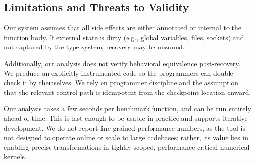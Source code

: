 \subsection{Limitations and Threats to Validity}
\label{sec:threats}

Our system assumes that all side effects are either annotated or internal to the function body. If external state is dirty (e.g., global variables, files, sockets) and not captured by the type system, recovery may be unsound.

Additionally, our analysis does not verify behavioral equivalence post-recovery. We produce an explicitly instrumented code so the programmers can double-check it by themselves. We rely on programmer discipline and the assumption that the relevant control path is idempotent from the checkpoint location onward.

Our analysis takes a few seconds per benchmark function, and can be run entirely ahead-of-time. This is fast enough to be usable in practice and supports iterative development. We do not report fine-grained performance numbers, as the tool is not designed to operate online or scale to large codebases; rather, its value lies in enabling precise transformations in tightly scoped, performance-critical numerical kernels.
